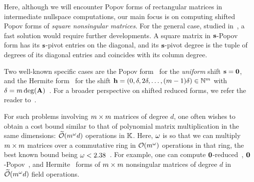 \documentclass[preprint]{sig-alternate-05-2015}
\begin{document}
Here, although we will encounter Popov forms of rectangular matrices in
intermediate nullspace computations, our main focus is on computing shifted
Popov forms of \emph{square nonsingular matrices}. For the general case,
studied in~\cite{BeLaVi06}, a fast solution would require further developments.
A square matrix in $\shifts$-Popov form has its $\shifts$-pivot entries on the
diagonal, and its $\shifts$-pivot degree is the tuple of degrees of its
diagonal entries and coincides with its column degree.

\begin{center}
\end{center}

Two well-known specific cases are the Popov form~\cite{Popov72,Kailath80} for
the \emph{uniform} shift $\shifts=\unishift$, and the Hermite
form~\cite{Hermite1851,Kailath80} for the shift $\shifts[h] = (0,\delta, 2
\delta,\ldots,(\rdim-1)\delta) \in \NN^\rdim$ with $\delta=\rdim
\deg(\mat{A})$~\cite[Lemma~2.6]{BeLaVi06}. For a broader perspective on shifted
reduced forms, we refer the reader to~\cite{BeLaVi06}.

\smallskip
For such problems involving $\rdim \times \rdim$ matrices of degree $d$, one
often wishes to obtain a cost bound similar to that of polynomial matrix
multiplication in the same dimensions: $\softO{\rdim^\expmatmul d}$ operations
in $\field$. Here, $\expmatmul$ is so that we can multiply $\rdim \times \rdim$
matrices over a commutative ring in $\bigO{\rdim^\expmatmul}$ operations in
that ring, the best known bound being $\expmatmul <
2.38$~\cite{CopWin90,LeGall14}. For example, one can compute
$\unishift$-reduced~\cite{GiJeVi03,GuSaStVa12},
$\unishift$-Popov~\cite{SarSto11}, and Hermite~\cite{Gupta11,ZhoLab16} forms of
$\rdim \times \rdim$ nonsingular matrices of degree $d$ in
$\softO{\rdim^\expmatmul d}$ field operations.
\end{document}
